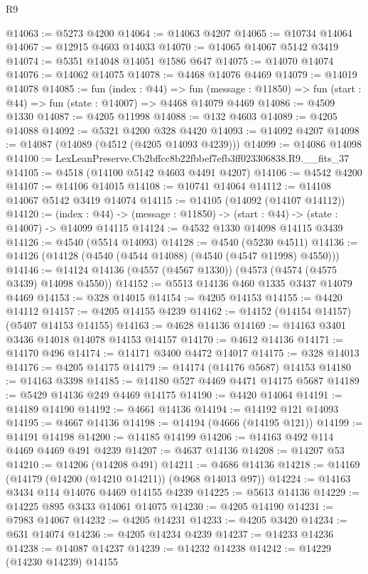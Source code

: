 \begin{lexlean}{R9}
\begin{coremodule}
@14063 := @5273 @4200
@14064 := @14063 @4207
@14065 := @10734 @14064
@14067 := @12915 @4603 @14033
@14070 := @14065 @14067 @5142 @3419
@14074 := @5351 @14048 @14051 @1586 @647
@14075 := @14070 @14074
@14076 := @14062 @14075
@14078 := @4468 @14076 @4469
@14079 := @14019 @14078
@14085 := fun (index : @44) =>
  fun (message : @11850) => fun (start : @44) => fun (state : @14007) => @4468 @14079 @4469
@14086 := @4509 @1330
@14087 := @4205 @11998
@14088 := @132 @4603
@14089 := @4205 @14088
@14092 := @5321 @4200 @328 @4420
@14093 := @14092 @4207
@14098 := @14087 (@14089 (@4512 (@4205 @14093 @4239)))
@14099 := @14086 @14098
@14100 := LexLeanPreserve.Cb2bffcc8b22fbbef7efb3ff023306838.R9.__fits_37
@14105 := @4518 (@14100 @5142 @4603 @4491 @4207)
@14106 := @4542 @4200
@14107 := @14106 @14015
@14108 := @10741 @14064
@14112 := @14108 @14067 @5142 @3419 @14074
@14115 := @14105 (@14092 (@14107 @14112))
@14120 := (index : @44) -> (message : @11850) -> (start : @44) -> (state : @14007) -> @14099 @14115
@14124 := @4532 @1330 @14098 @14115 @3439
@14126 := @4540 (@5514 @14093)
@14128 := @4540 (@5230 @4511)
@14136 := @14126 (@14128 (@4540 (@4544 @14088) (@4540 (@4547 @11998) @4550)))
@14146 := @14124 @14136 (@4557 (@4567 @1330)) (@4573 (@4574 (@4575 @3439) @14098 @4550))
@14152 := @5513 @14136 @460 @1335 @3437 @14079 @4469
@14153 := @328 @14015
@14154 := @4205 @14153
@14155 := @4420 @14112
@14157 := @4205 @14155 @4239
@14162 := @14152 (@14154 @14157) (@5407 @14153 @14155)
@14163 := @4628 @14136
@14169 := @14163 @3401 @3436 @14018 @14078 @14153 @14157
@14170 := @4612 @14136
@14171 := @14170 @496
@14174 := @14171 @3400 @4472 @14017
@14175 := @328 @14013
@14176 := @4205 @14175
@14179 := @14174 (@14176 @5687) @14153
@14180 := @14163 @3398
@14185 := @14180 @527 @4469 @4471 @14175 @5687
@14189 := @5429 @14136 @249 @4469 @14175
@14190 := @4420 @14064
@14191 := @14189 @14190
@14192 := @4661 @14136
@14194 := @14192 @121 @14093
@14195 := @4667 @14136
@14198 := @14194 (@4666 (@14195 @121))
@14199 := @14191 @14198
@14200 := @14185 @14199
@14206 := @14163 @492 @114 @4469 @4469 @491 @4239
@14207 := @4637 @14136
@14208 := @14207 @53
@14210 := @14206 (@14208 @491)
@14211 := @4686 @14136
@14218 := @14169 (@14179 (@14200 (@14210 @14211)) (@4968 @14013 @97))
@14224 := @14163 @3434 @114 @14076 @4469 @14155 @4239
@14225 := @5613 @14136
@14229 := @14225 @895 @3433 @14061 @14075
@14230 := @4205 @14190
@14231 := @7983 @14067
@14232 := @4205 @14231
@14233 := @4205 @3420
@14234 := @631 @14074
@14236 := @4205 @14234 @4239
@14237 := @14233 @14236
@14238 := @14087 @14237
@14239 := @14232 @14238
@14242 := @14229 (@14230 @14239) @14155

\end{coremodule}
\end{lexlean}
